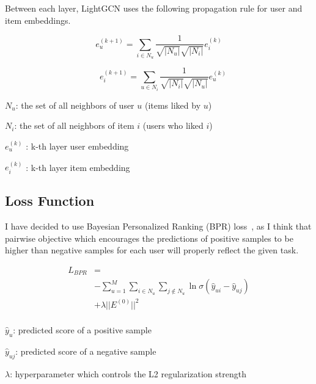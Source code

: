Between each layer, LightGCN uses the following propagation rule for user and
item embeddings.

\begin{equation}
    e_u^{(k+1)} = \sum_{i \in N_u} \frac{1}{\sqrt{|N_u|}\sqrt{|N_i|}}e_i^{(k)}
\end{equation}

\begin{equation}
    \quad e_i^{(k+1)} = \sum_{u \in N_i} \frac{1}{\sqrt{|N_i|}\sqrt{|N_u|}} e_u^{(k)}
\end{equation}

$N_u$: the set of all neighbors of user $u$ (items liked by $u$)

$N_i$: the set of all neighbors of item $i$ (users who liked $i$)

$e_u^{(k)}$ : k-th layer user embedding

$e_i^{(k)}$ : k-th layer item embedding

\subsection{Loss Function}

I have decided to use Bayesian Personalized Ranking (BPR)
loss~\cite{rendleBPRBayesianPersonalized2012}, as I think that pairwise
objective which encourages the predictions of positive samples to be higher
than negative samples for each user will properly reflect the given task.

\begin{equation}
    \begin{aligned}
        L_{BPR} & =                                                                                             \\
                & -\sum_{u = 1}^M \sum_{i \in N_u} \sum_{j \notin N_u} \ln{\sigma(\hat{y}_{ui} - \hat{y}_{uj})} \\
                & + \lambda ||E^{(0)}||^2                                                                       \\
    \end{aligned}
\end{equation}

$\hat{y}_{u}$: predicted score of a positive sample

$\hat{y}_{uj}$: predicted score of a negative sample

$\lambda$: hyperparameter which controls the L2 regularization strength